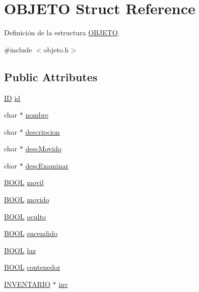 \hypertarget{structOBJETO}{
\section{OBJETO Struct Reference}
\label{structOBJETO}
}


Definición de la estructura \hyperlink{structOBJETO}{OBJETO}.  




{\ttfamily \#include $<$objeto.h$>$}

\subsection*{Public Attributes}
\begin{DoxyCompactItemize}
\item 
\hyperlink{tipos_8h_a483fb3895d39b2ee95d50073243d077e}{ID} \hyperlink{structOBJETO_a39cde9d0235d61bb61547447ee6cde38}{id}
\item 
char $\ast$ \hyperlink{structOBJETO_a5dcd58f147feb097bab5361e7b5381fa}{nombre}
\item 
char $\ast$ \hyperlink{structOBJETO_afcd768e04fe1a5f48754705249abd2f3}{descripcion}
\item 
char $\ast$ \hyperlink{structOBJETO_a1082c3ded3e9fec0eaa9c7558eafffd0}{descMovido}
\item 
char $\ast$ \hyperlink{structOBJETO_a99f06d3d28d653102f7deb8416d2b48e}{descExaminar}
\item 
\hyperlink{tipos_8h_a3e5b8192e7d9ffaf3542f1210aec18dd}{BOOL} \hyperlink{structOBJETO_a61c56c0689f2dafb7c5ee307ca4b0e14}{movil}
\item 
\hyperlink{tipos_8h_a3e5b8192e7d9ffaf3542f1210aec18dd}{BOOL} \hyperlink{structOBJETO_a7a534a47dfbee7fb8e61a959f6e0c58c}{movido}
\item 
\hyperlink{tipos_8h_a3e5b8192e7d9ffaf3542f1210aec18dd}{BOOL} \hyperlink{structOBJETO_a5e530e872fe10273e41f14fc8cab153c}{oculto}
\item 
\hyperlink{tipos_8h_a3e5b8192e7d9ffaf3542f1210aec18dd}{BOOL} \hyperlink{structOBJETO_ab086a1ad0cd88575f6b821ac51f565c4}{encendido}
\item 
\hyperlink{tipos_8h_a3e5b8192e7d9ffaf3542f1210aec18dd}{BOOL} \hyperlink{structOBJETO_a3c8e42fab0378205bbcc451c5712c2d5}{luz}
\item 
\hyperlink{tipos_8h_a3e5b8192e7d9ffaf3542f1210aec18dd}{BOOL} \hyperlink{structOBJETO_ab850d0f6ff7d6cf1ab11958d7f442db0}{contenedor}
\item 
\hyperlink{structCONJUNTO}{INVENTARIO} $\ast$ \hyperlink{structOBJETO_a826a56ca0057306b92282ce8794b5484}{inv}
\end{DoxyCompactItemize}


